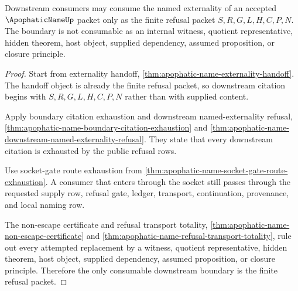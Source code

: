 \begin{theorem}
\label{thm:apophatic-name-downstream-boundary-consumption}
Downstream consumers may consume the named externality of an accepted $\ApophaticNameUp$ packet only as the finite refusal packet $S,R,G,L,H,C,P,N$. The boundary is not consumable as an internal witness, quotient representative, hidden theorem, host object, supplied dependency, assumed proposition, or closure principle.
\end{theorem}
\begin{proof}
Start from externality handoff, \autoref{thm:apophatic-name-externality-handoff}. The handoff object is already the finite refusal packet, so downstream citation begins with $S,R,G,L,H,C,P,N$ rather than with supplied content.

Apply boundary citation exhaustion and downstream named-externality refusal, \autoref{thm:apophatic-name-boundary-citation-exhaustion} and \autoref{thm:apophatic-name-downstream-named-externality-refusal}. They state that every downstream citation is exhausted by the public refusal rows.

Use socket-gate route exhaustion from \autoref{thm:apophatic-name-socket-gate-route-exhaustion}. A consumer that enters through the socket still passes through the requested supply row, refusal gate, ledger, transport, continuation, provenance, and local naming row.

The non-escape certificate and refusal transport totality, \autoref{thm:apophatic-name-non-escape-certificate} and \autoref{thm:apophatic-name-refusal-transport-totality}, rule out every attempted replacement by a witness, quotient representative, hidden theorem, host object, supplied dependency, assumed proposition, or closure principle. Therefore the only consumable downstream boundary is the finite refusal packet.
\end{proof}

